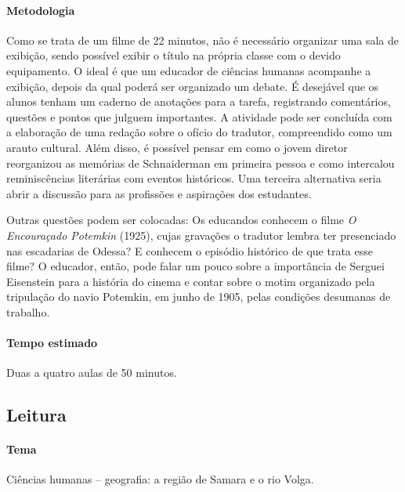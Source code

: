 \documentclass[11pt]{extarticle}
\begin{document}

\paragraph{Metodologia}
Como se trata de um filme de 22 minutos, não é necessário organizar uma
sala de exibição, sendo possível exibir o título na própria classe com o devido equipamento. O ideal é que um educador de ciências humanas acompanhe a exibição,
depois da qual poderá ser organizado um debate. É desejável que os
alunos tenham um caderno de anotações para a tarefa, registrando
comentários, questões e pontos que julguem importantes. A atividade pode
ser concluída com a elaboração de uma redação sobre o ofício do
tradutor, compreendido como um arauto cultural. Além disso, é possível
pensar em como o jovem diretor reorganizou as memórias de Schnaiderman
em primeira pessoa e como intercalou reminiscências literárias com
eventos históricos. Uma terceira alternativa seria abrir a discussão
para as profissões e aspirações dos estudantes.

Outras questões podem ser colocadas: Os educandos conhecem o filme
\emph{O Encouraçado Potemkin} (1925), cujas gravações o tradutor lembra
ter presenciado nas escadarias de Odessa? E conhecem o episódio
histórico de que trata esse filme? O educador, então, pode falar um
pouco sobre a importância de Serguei Eisenstein para a história do
cinema e contar sobre o motim organizado pela tripulação do navio
Potemkin, em junho de 1905, pelas condições desumanas de trabalho.

\paragraph{Tempo estimado} Duas a quatro aulas de 50 minutos.


\subsection{Leitura}

\paragraph{Tema} Ciências humanas -- geografia: a região de Samara e o rio Volga.

\end{document}

